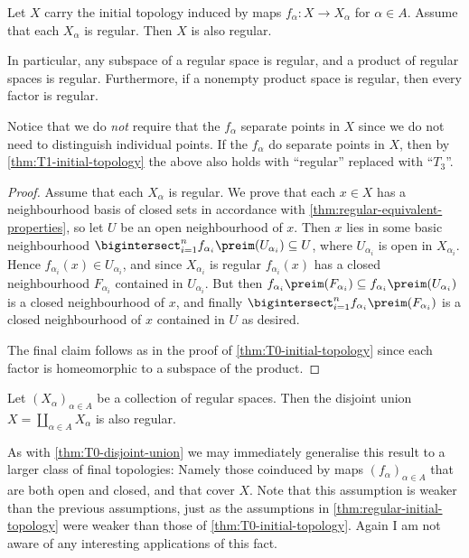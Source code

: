 \documentclass[article, a4paper, 11pt, oneside]{memoir}
\numberwithin{equation}{chapter}
\begin{document}
\begin{proposition}
    \label{thm:regular-initial-topology}
    Let $X$ carry the initial topology induced by maps $f_\alpha \colon X \to X_\alpha$ for $\alpha \in A$. Assume that each $X_\alpha$ is regular. Then $X$ is also regular.

    In particular, any subspace of a regular space is regular, and a product of regular spaces is regular. Furthermore, if a nonempty product space is regular, then every factor is regular.
\end{proposition}
%
Notice that we do \emph{not} require that the $f_\alpha$ separate points in $X$ since we do not need to distinguish individual points. If the $f_\alpha$ do separate points in $X$, then by \cref{thm:T1-initial-topology} the above also holds with \enquote{regular} replaced with \enquote{$T_3$}.

\begin{proof}
    Assume that each $X_\alpha$ is regular. We prove that each $x \in X$ has a neighbourhood basis of closed sets in accordance with \cref{thm:regular-equivalent-properties}, so let $U$ be an open neighbourhood of $x$. Then $x$ lies in some basic neighbourhood $\bigintersect_{i=1}^n f_{\alpha_i}\preim(U_{\alpha_i}) \subseteq U$, where $U_{\alpha_i}$ is open in $X_{\alpha_i}$. Hence $f_{\alpha_i}(x) \in U_{\alpha_i}$, and since $X_{\alpha_i}$ is regular $f_{\alpha_i}(x)$ has a closed neighbourhood $F_{\alpha_i}$ contained in $U_{\alpha_i}$. But then $f_{\alpha_i}\preim(F_{\alpha_i}) \subseteq f_{\alpha_i}\preim(U_{\alpha_i})$ is a closed neighbourhood of $x$, and finally $\bigintersect_{i=1}^n f_{\alpha_i}\preim(F_{\alpha_i})$ is a closed neighbourhood of $x$ contained in $U$ as desired.

    The final claim follows as in the proof of \cref{thm:T0-initial-topology} since each factor is homeomorphic to a subspace of the product.
\end{proof}


\begin{proposition}
    Let $(X_\alpha)_{\alpha \in A}$ be a collection of regular spaces. Then the disjoint union $X = \coprod_{\alpha \in A} X_\alpha$ is also regular. %
\end{proposition}
%
As with \cref{thm:T0-disjoint-union} we may immediately generalise this result to a larger class of final topologies: Namely those coinduced by maps $(f_\alpha)_{\alpha \in A}$ that are both open and closed, and that cover $X$. Note that this assumption is weaker than the previous assumptions, just as the assumptions in \cref{thm:regular-initial-topology} were weaker than those of \cref{thm:T0-initial-topology}. Again I am not aware of any interesting applications of this fact.
\end{document}
